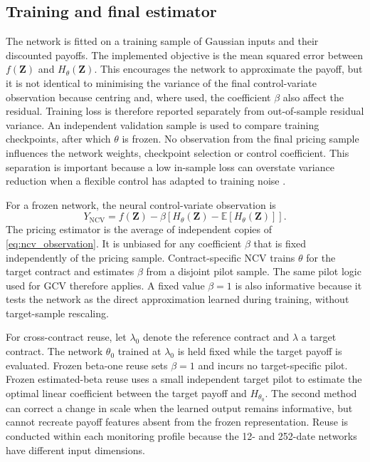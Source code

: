 \subsection{Training and final estimator}

The network is fitted on a training sample of Gaussian inputs and their discounted payoffs. The implemented objective is the mean squared error between $f(\mathbf{Z})$ and $H_{\theta}(\mathbf{Z})$. This encourages the network to approximate the payoff, but it is not identical to minimising the variance of the final control-variate observation because centring and, where used, the coefficient $\beta$ also affect the residual. Training loss is therefore reported separately from out-of-sample residual variance. An independent validation sample is used to compare training checkpoints, after which $\theta$ is frozen. No observation from the final pricing sample influences the network weights, checkpoint selection or control coefficient. This separation is important because a low in-sample loss can overstate variance reduction when a flexible control has adapted to training noise \parencite{wan_zhong_xiong_zhu_2020}.

For a frozen network, the neural control-variate observation is
\begin{equation}
Y_{\mathrm{NCV}} = f(\mathbf{Z}) - \beta\left[H_{\theta}(\mathbf{Z}) - \mathbb{E}\left[H_{\theta}(\mathbf{Z})\right]\right].
\label{eq:ncv_observation}
\end{equation}
The pricing estimator is the average of independent copies of \eqref{eq:ncv_observation}. It is unbiased for any coefficient $\beta$ that is fixed independently of the pricing sample. Contract-specific NCV trains $\theta$ for the target contract and estimates $\beta$ from a disjoint pilot sample. The same pilot logic used for GCV therefore applies. A fixed value $\beta = 1$ is also informative because it tests the network as the direct approximation learned during training, without target-sample rescaling.

For cross-contract reuse, let $\lambda_0$ denote the reference contract and $\lambda$ a target contract. The network $\theta_0$ trained at $\lambda_0$ is held fixed while the target payoff is evaluated. Frozen beta-one reuse sets $\beta = 1$ and incurs no target-specific pilot. Frozen estimated-beta reuse uses a small independent target pilot to estimate the optimal linear coefficient between the target payoff and $H_{\theta_0}$. The second method can correct a change in scale when the learned output remains informative, but cannot recreate payoff features absent from the frozen representation. Reuse is conducted within each monitoring profile because the 12- and 252-date networks have different input dimensions.

